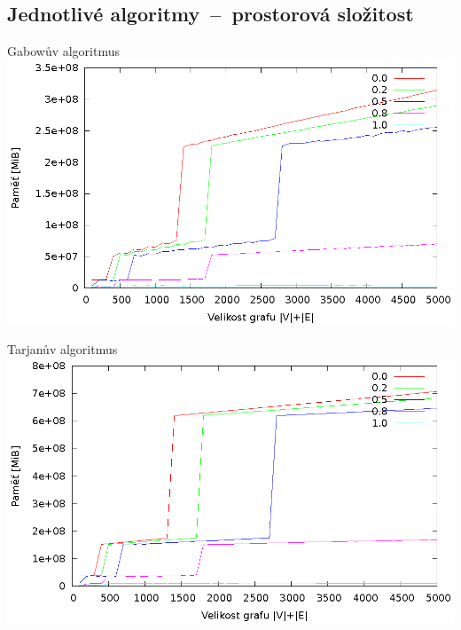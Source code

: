 \documentclass{beamer}
\begin{document}
\subsection{Jednotlivé algoritmy\ --\ prostorová složitost}
\begin{frame}{Gabowův algoritmus}
  \includegraphics[width=\textwidth,height=\textheight,keepaspectratio]{gabow_memory}
\end{frame}
\begin{frame}{Tarjanův algoritmus}
  \includegraphics[width=\textwidth,height=\textheight,keepaspectratio]{tarjan_memory}
\end{frame}
\end{document}
